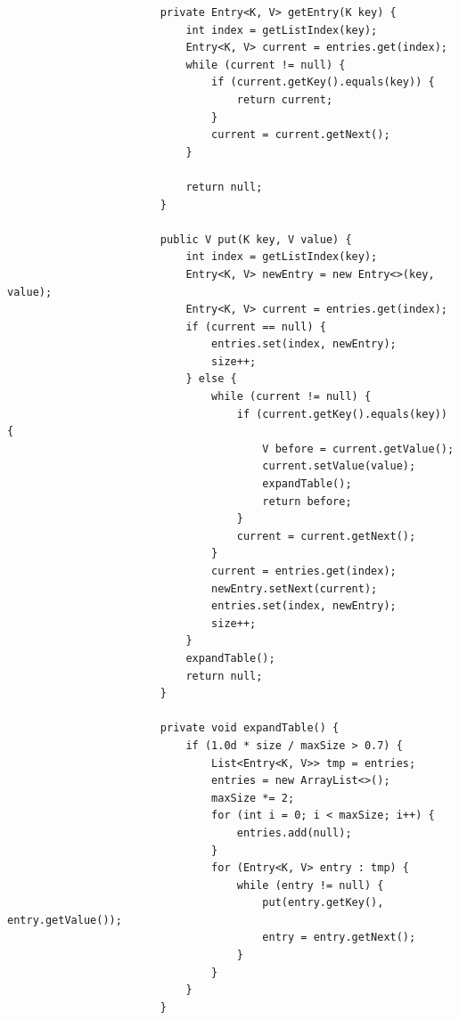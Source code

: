 \documentclass[a4paper, landscape, 8pt]{scrartcl}
\begin{document}
\begin{multicols*}{4}
\begin{lstlisting}
                        private Entry<K, V> getEntry(K key) {
                            int index = getListIndex(key);
                            Entry<K, V> current = entries.get(index);
                            while (current != null) {
                                if (current.getKey().equals(key)) {
                                    return current;
                                }
                                current = current.getNext();
                            }

                            return null;
                        }

                        public V put(K key, V value) {
                            int index = getListIndex(key);
                            Entry<K, V> newEntry = new Entry<>(key, value);
                            Entry<K, V> current = entries.get(index);
                            if (current == null) {
                                entries.set(index, newEntry);
                                size++;
                            } else {
                                while (current != null) {
                                    if (current.getKey().equals(key)) {
                                        V before = current.getValue();
                                        current.setValue(value);
                                        expandTable();
                                        return before;
                                    }
                                    current = current.getNext();
                                }
                                current = entries.get(index);
                                newEntry.setNext(current);
                                entries.set(index, newEntry);
                                size++;
                            }
                            expandTable();
                            return null;
                        }

                        private void expandTable() {
                            if (1.0d * size / maxSize > 0.7) {
                                List<Entry<K, V>> tmp = entries;
                                entries = new ArrayList<>();
                                maxSize *= 2;
                                for (int i = 0; i < maxSize; i++) {
                                    entries.add(null);
                                }
                                for (Entry<K, V> entry : tmp) {
                                    while (entry != null) {
                                        put(entry.getKey(), entry.getValue());
                                        entry = entry.getNext();
                                    }
                                }
                            }
                        }


\end{lstlisting}
\end{multicols*}
\end{document}
